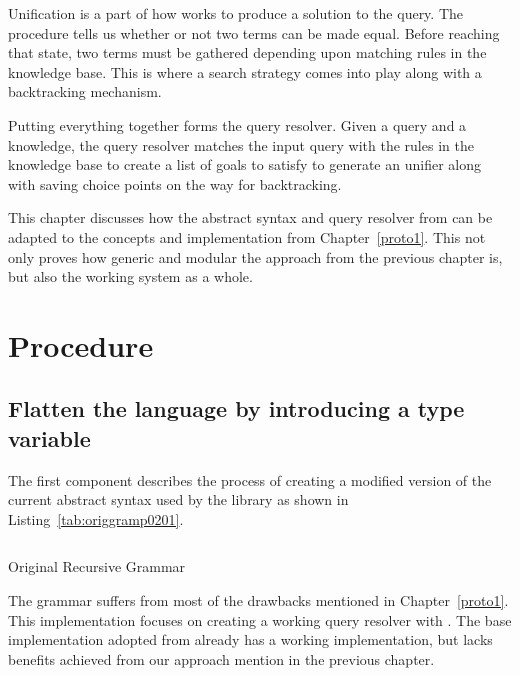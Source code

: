 \documentclass[thesis-solanki.tex]{subfiles}
\begin{document}
Unification is a part of how  works to produce a solution to the query.
The  procedure tells us whether or not two terms can be made equal.
Before reaching that state, two terms must be gathered depending upon matching rules in the knowledge base.
This is where a search strategy comes into play along with a backtracking mechanism.

Putting everything together forms the  query resolver.
Given a query and a knowledge, the query resolver matches the input query with the rules in the knowledge base to
create a list of goals to satisfy to generate an unifier along with saving choice points on the way for
backtracking.

This chapter discusses how the abstract syntax and query resolver from \cite{prolog-lib} can be adapted to the
concepts and implementation from Chapter~\ref{proto1}.
This not only proves how generic and modular the approach from the previous chapter is, but also the working
 system as a whole.


\section{Procedure}


\subsection{Flatten the language by introducing a type variable}
The first component describes the process of creating a modified version of the current abstract syntax used by the
library as shown in Listing~\ref{tab:origgramp0201}.

\begin{code-list}[H]
	\begin{singlespace}
	\inputminted[linenos]{haskell}{haskell-proto2-original-grammar.hs}
	\end{singlespace}
	\caption{Original Recursive Grammar}
\label{tab:origgramp0201}
\end{code-list}

The grammar suffers from most of the drawbacks mentioned in Chapter~\ref{proto1}.
This implementation focuses on creating a working  query resolver with 
.
The base implementation adopted from  \cite{prolog-lib} already has a working
implementation, but lacks benefits achieved from our approach mention in the previous chapter.
\end{document}
